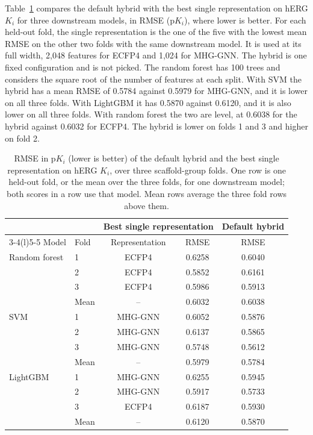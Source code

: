 Table~\ref{tab:prelim_default_vs_single} compares the default hybrid with the best single representation on hERG $K_i$ for three downstream models, in RMSE (p$K_i$), where lower is better. For each held-out fold, the single representation is the one of the five with the lowest mean RMSE on the other two folds with the same downstream model. It is used at its full width, 2,048 features for ECFP4 and 1,024 for MHG-GNN. The hybrid is one fixed configuration and is not picked. The random forest has 100 trees and considers the square root of the number of features at each split. With SVM the hybrid has a mean RMSE of 0.5784 against 0.5979 for MHG-GNN, and it is lower on all three folds. With LightGBM it has 0.5870 against 0.6120, and it is also lower on all three folds. With random forest the two are level, at 0.6038 for the hybrid against 0.6032 for ECFP4. The hybrid is lower on folds 1 and 3 and higher on fold 2.

\begin{table}[htbp]
\centering
\small
\begin{tabular}{@{}llccc@{}}
\toprule
 & & \multicolumn{2}{c}{Best single representation} & Default hybrid \\
\cmidrule(lr){3-4}\cmidrule(l){5-5}
Model & Fold & Representation & RMSE & RMSE \\
\midrule
Random forest & 1 & ECFP4 & 0.6258 & 0.6040 \\
 & 2 & ECFP4 & 0.5852 & 0.6161 \\
 & 3 & ECFP4 & 0.5986 & 0.5913 \\
 & Mean & -- & 0.6032 & 0.6038 \\
\addlinespace
SVM & 1 & MHG-GNN & 0.6052 & 0.5876 \\
 & 2 & MHG-GNN & 0.6137 & 0.5865 \\
 & 3 & MHG-GNN & 0.5748 & 0.5612 \\
 & Mean & -- & 0.5979 & 0.5784 \\
\addlinespace
LightGBM & 1 & MHG-GNN & 0.6255 & 0.5945 \\
 & 2 & MHG-GNN & 0.5917 & 0.5733 \\
 & 3 & ECFP4 & 0.6187 & 0.5930 \\
 & Mean & -- & 0.6120 & 0.5870 \\
\bottomrule
\end{tabular}
\caption[Default hybrid and best single representation on hERG $K_i$.]{RMSE in p$K_i$ (lower is better) of the default hybrid and the best single representation on hERG $K_i$, over three scaffold-group folds. One row is one held-out fold, or the mean over the three folds, for one downstream model; both scores in a row use that model. Mean rows average the three fold rows above them.}
\label{tab:prelim_default_vs_single}
\end{table}

